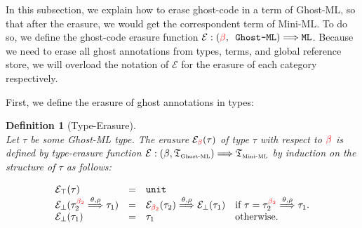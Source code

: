 \documentclass[a4paper,11pt,oneside]{article}
\theoremstyle{plain}
\newtheorem{definition}{Definition}[subsection]
\newcommand{\gb}{\beta}
\newcommand{\gba}[1]{\beta_{#1}}
\newcommand{\gbr}{\textcolor{red}{\gb}}
\newcommand{\gbra}[1]{\textcolor{red}{\gba{#1}}}
\newcommand{\e}{\mathcal{E}}
\begin{document}
In this subsection, we explain how to erase ghost-code in a term of Ghost-ML, so that
after the erasure, we would get the correspondent term of Mini-ML. 
To do so, we define the ghost-code erasure function $\e: (\gbr,\texttt{ Ghost-ML}) \Longrightarrow \texttt{ML}$. 
Because we need to erase all ghost annotations from types, terms, and global reference store, we will overload the notation of $\e$ for the erasure of each  category respectively.

First, we define the erasure of ghost annotations in types:
\begin{definition}[Type-Erasure] 
\label{type-erasure}
\hypertarget{type-erasure}{}
~\\
Let $\tau$ be some Ghost-ML type.
The erasure $\e_{\gbr}(\tau)$ of type $\tau$ with respect to $\gbr$ is defined by type-erasure function $\e: (\beta, \mathfrak{T}_{\text{\tiny Ghost-ML}}) \Longrightarrow \mathfrak{T}_{\text{\tiny Mini-ML}}$ by induction on the structure of $\tau$ as follows:
\begin{small}
\begin{displaymath} 
\begin{array}{llll}
 \e_{\top}(\tau) &=& \texttt{unit} & \\
 
\e_{\bot}(\tau_{2}^{\gbra{2}} \stackrel{\theta, \rho}{\Longrightarrow} \tau_{1})  
&=& \e_{\gbra{2}}(\tau_{2}) \stackrel{\theta, \rho}{\Longrightarrow} \e_{\bot}(\tau_{1}) &  \text{if } \tau = \tau_{2}^{\gbra{2}} \stackrel{\theta, \rho}{\Longrightarrow} \tau_{1}. \\
\e_{\bot}(\tau_{1}) &=& \tau_{1} & \text{otherwise}.\\
\end{array}
\end{displaymath}
\end{small}
\end{definition}
\end{document}
